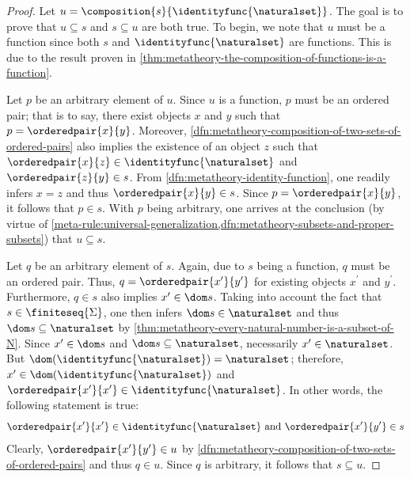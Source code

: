 \begin{proof}
    Let \( u = \composition{s}{ \identityfunc{\naturalset} } \).
    The goal is to prove that \( u \subseteq s \) and \( s \subseteq u \) are both true.
    To begin, we note that \( u \) must be a function since both \( s \) and \( \identityfunc{\naturalset} \) are functions.
    This is due to the result proven in \cref{thm:metatheory-the-composition-of-functions-is-a-function}.

    \vspace{0.3cm}
    \noindent
    Let \( p \) be an arbitrary element of \( u \).
    Since \( u \) is a function, \( p \) must be an ordered pair; that is to say, there exist objects \( x \) and \( y \)
    such that \( p = \orderedpair{x}{y} \).
    Moreover, \cref{dfn:metatheory-composition-of-two-sets-of-ordered-pairs} also implies the existence of an object \( z \)
    such that \( \orderedpair{x}{z} \in \identityfunc{\naturalset} \) and \( \orderedpair{z}{y} \in s \).
    From \cref{dfn:metatheory-identity-function}, one readily infers \( x = z \) and thus \( \orderedpair{x}{y} \in s \).
    Since \( p = \orderedpair{x}{y} \), it follows that \( p \in s \).
    With \( p \) being arbitrary, one arrives at the conclusion (by virtue of \cref{meta-rule:universal-generalization,dfn:metatheory-subsets-and-proper-subsets})
    that \( u \subseteq s \).

    \vspace{0.3cm}
    \noindent
    Let \( q \) be an arbitrary element of \( s \).
    Again, due to \( s \) being a function, \( q \) must be an ordered pair.
    Thus, \( q = \orderedpair{x^{\prime}}{y^{\prime}} \) for existing objects \( x^{\prime} \) and \( y^{\prime} \).
    Furthermore, \( q \in s \) also implies \( x^{\prime} \in \dom s \).
    Taking into account the fact that \( s \in \finiteseq{\Sigma} \), one then infers \( \dom s \in \naturalset \) and thus \( \dom s \subseteq \naturalset \)
    by \cref{thm:metatheory-every-natural-number-is-a-subset-of-N}.
    Since \( x^{\prime} \in \dom s \) and \( \dom s \subseteq \naturalset \), necessarily \( x^{\prime} \in \naturalset \).
    But \( \dom \mleft( \identityfunc{\naturalset} \mright) = \naturalset \); therefore, \( x^{\prime} \in \dom \mleft( \identityfunc{\naturalset} \mright) \) and
    \( \orderedpair{x^{\prime}}{x^{\prime}} \in \identityfunc{\naturalset} \).
    In other words, the following statement is true:
    \begin{equation*}
        \orderedpair{x^{\prime}}{x^{\prime}} \in \identityfunc{\naturalset} \ \text{and} \ \orderedpair{x^{\prime}}{y^{\prime}} \in s
    \end{equation*}
    Clearly, \( \orderedpair{x^{\prime}}{y^{\prime}} \in u \) by \cref{dfn:metatheory-composition-of-two-sets-of-ordered-pairs} and thus \( q \in u \).
    Since \( q \) is arbitrary, it follows that \( s \subseteq u \).
\end{proof}

